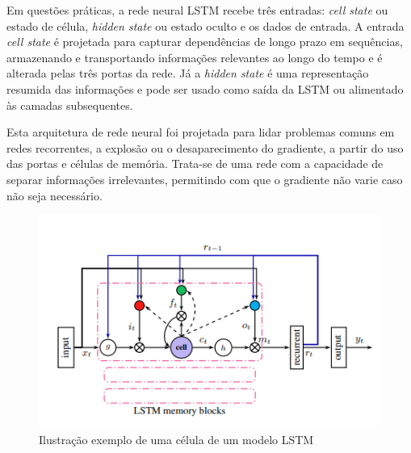 Em questões práticas, a rede neural LSTM recebe três entradas: \textit{cell state} ou estado de célula, \textit{hidden state} ou estado oculto e os dados de entrada. A entrada \textit{cell state} é projetada para capturar dependências de longo prazo em sequências, armazenando e transportando informações relevantes ao longo do tempo e é alterada pelas três portas da rede. Já a \textit{hidden state} é uma representação resumida das informações e pode ser usado como saída da LSTM ou alimentado às camadas subsequentes.

Esta arquitetura de rede neural foi projetada para lidar problemas comuns em redes recorrentes, a explosão ou o desaparecimento do gradiente, a partir do uso das portas e células de memória. Trata-se de uma rede com a capacidade de separar informações irrelevantes, permitindo com que o gradiente não varie caso não seja necessário.

\begin{figure}[htb]
	\centering
	\begin{minipage}{0.7\linewidth}
		\centering
		\includegraphics[width=\linewidth]{tg1/figuras/lstm.png}
		\caption{Ilustração exemplo de uma célula de um modelo LSTM
            \cite{lstm_fig}} \label{fig:lstmcell}
	\end{minipage}
\end{figure}

